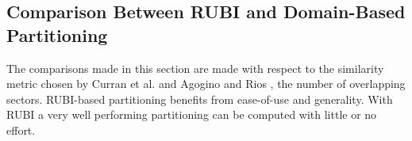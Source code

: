 \documentclass[letterpaper]{article}
\begin{document}






\subsection{Comparison Between RUBI and Domain-Based Partitioning}

The comparisons made in this section are made with respect to the similarity metric chosen by Curran et al. \cite{Curran:2013:AHC:2484920.2485183} and Agogino and Rios \cite{Agogino:2009:EEM:1570256.1570258,Rios}, the number of overlapping sectors. RUBI-based partitioning benefits from ease-of-use and generality. With RUBI a very well performing partitioning can be computed with little or no effort.
\end{document}
